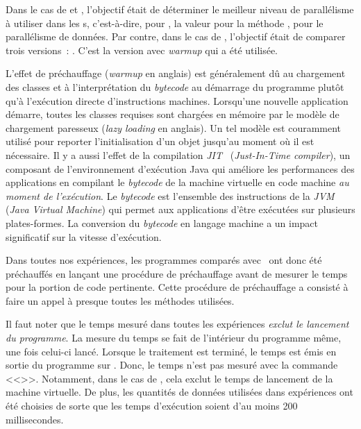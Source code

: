 Dans le cas de  et , l'objectif \'etait de d\'eterminer le meilleur niveau de parall\'elisme \`a utiliser dans les s, c'est-\`a-dire, pour , la valeur pour la m\'ethode , pour le parall\'elisme de donn\'ees.
%
Par contre, dans le cas de , l'objectif était de comparer trois versions~: .
%
C'est la version avec \emph{warmup} qui a \'et\'e utilis\'ee.



L'effet de pr\'echauffage (\emph{warmup} en anglais) est g\'en\'eralement d\^u au chargement des classes et \`a l'interpr\'etation du \emph{bytecode} au d\'emarrage du programme plutôt qu'à l'exécution directe d'instructions machines. Lorsqu'une nouvelle application d\'emarre, toutes les classes requises sont charg\'ees en m\'emoire par le mod\`ele de chargement paresseux (\emph{lazy loading} en anglais). Un tel mod\`ele est couramment utilis\'e pour reporter l'initialisation d'un objet jusqu'au moment o\`u il est n\'ecessaire.
%
\label{jitDescription.sect}
%
Il y a aussi l'effet de la compilation 
\emph{JIT}~\citep{cramer1997compiling} (\emph{Just-In-Time compiler}),
%
un composant de l'environnement d'ex\'ecution Java qui am\'eliore les performances des applications en compilant le \emph{bytecode} de la machine virtuelle en code machine \emph{au moment de l'ex\'ecution}. Le \emph{bytecode} est l'ensemble des instructions de la \emph{JVM} (\emph{Java Virtual Machine}) qui permet aux applications d'\^etre ex\'ecut\'ees sur plusieurs plates-formes. La conversion du \emph{bytecode} en langage machine a un impact significatif sur la vitesse d'ex\'ecution.

Dans toutes nos exp\'eriences, les programmes  comparés avec \ppff\ ont donc \'et\'e pr\'echauff\'es en lan\c{c}ant une proc\'edure de pr\'echauffage avant de mesurer le temps pour la portion de code pertinente. Cette proc\'edure de pr\'echauffage a consisté à faire un appel à presque toutes les m\'ethodes utilis\'ees.
%
%
 
Il faut noter que le temps mesur\'e dans toutes les exp\'eriences \emph{exclut le lancement du programme}. La mesure du temps se fait de l'int\'erieur du programme m\^eme, une fois celui-ci lanc\'e. Lorsque le traitement est termin\'e, le temps est \'emis en sortie du programme sur . Donc, le temps n'est pas mesur\'e avec la commande <<>>. Notamment, dans le cas de , cela exclut le temps de lancement de la machine virtuelle. De plus, les quantit\'es de donn\'ees utilis\'ees dans exp\'eriences ont \'et\'e choisies de sorte que les temps d'ex\'ecution soient d'au moins 200 millisecondes.

